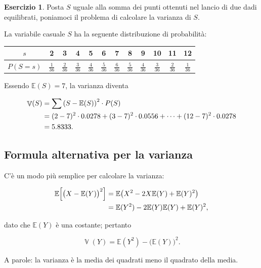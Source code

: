 \documentclass[
  11pt,
]{krantz}
\newcommand{\E}{\mathbb{E}} %
\DeclareMathOperator{\Var}{\mathbb{V}} %
\theoremstyle{definition}
\theoremstyle{definition}
\theoremstyle{definition}
\newtheorem{exercise}{Esercizio}[chapter]
\theoremstyle{definition}
\theoremstyle{remark}
\begin{document}
\begin{exercise}
Posta \(S\) uguale alla somma dei punti ottenuti nel lancio di due dadi equilibrati, poniamoci il problema di calcolare la varianza di \(S\).

La variabile casuale \(S\) ha la seguente distribuzione di probabilità:

\begin{longtable}[]{@{}cccccccccccc@{}}
\toprule
\(s\) & 2 & 3 & 4 & 5 & 6 & 7 & 8 & 9 & 10 & 11 & 12 \\
\midrule
\endhead
\(P(S = s)\) & \(\frac{1}{36}\) & \(\frac{2}{36}\) & \(\frac{3}{36}\) & \(\frac{4}{36}\) & \(\frac{5}{36}\) & \(\frac{6}{36}\) & \(\frac{5}{36}\) & \(\frac{4}{36}\) & \(\frac{3}{36}\) & \(\frac{2}{36}\) & \(\frac{1}{36}\) \\
\bottomrule
\end{longtable}

\noindent Essendo \(\E(S) = 7\), la varianza diventa

\begin{align}
\Var(S) &= \sum \left(S- \mathbb{E}(S)\right)^2 \cdot P(S) \notag\\
&= (2 - 7)^2 \cdot 0.0278 + (3-7)^2 \cdot 0.0556 + \dots + (12 - 7)^2 \cdot 0.0278 \notag\\
&= 5.8333.\notag
\end{align}
\end{exercise}

\hypertarget{formula-alternativa-per-la-varianza}{%
\subsection{Formula alternativa per la varianza}\label{formula-alternativa-per-la-varianza}}

C'è un modo più semplice per calcolare la varianza:

\begin{align}
\E\Big[\big(X - \E(Y)\big)^2\Big] &= \E\big(X^2 - 2X\E(Y) + \E(Y)^2\big)\notag\\
&= \E(Y^2) - 2\E(Y)\E(Y) + \E(Y)^2,\notag
\end{align}

dato che \(\E(Y)\) è una costante; pertanto

\begin{equation}
\Var(Y) = \E(Y^2) - \big(\E(Y) \big)^2.
\label{eq:def-alt-var-rv}
\end{equation}

A parole: la varianza è la media dei quadrati meno il quadrato della media.
\end{document}
